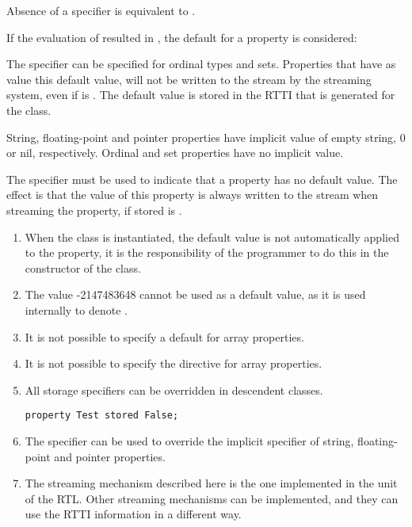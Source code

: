 \begin{remark}
Absence of a  specifier is equivalent to .
\end{remark}

If the evaluation of  resulted in , the default for a
property is considered:

The  specifier can be specified for ordinal types and sets.
Properties that have as value this default value, will not be written to
the stream by the streaming system, even if  is .
The default value is stored in the RTTI that is generated for the class.

String, floating-point and pointer properties have implicit 
value of empty string, 0 or nil, respectively.
Ordinal and set properties have no implicit  value.

The  specifier must be used to indicate
that a property has no default value. The effect is that the value of this
property is always written to the stream when streaming the property, if
stored is .

\begin{remark}
\begin{enumerate}
\item When the class is instantiated, the default value is not automatically
applied to the property, it is the responsibility of the programmer to do
this in the constructor of the class.
\item The value -2147483648 cannot be used as a default value, as it is used
internally to denote .
\item It is not possible to specify a default for array properties.
\item It is not possible to specify the  directive for array properties.
\item All storage specifiers can be overridden in descendent classes.
\begin{verbatim}
property Test stored False;
\end{verbatim}
\item The  specifier can be used to override the implicit
 specifier of string, floating-point and pointer properties.
\item The streaming mechanism described here is the one implemented in the
 unit of the RTL. Other streaming mechanisms can be
implemented, and they can use the RTTI information in a different way.
\end{enumerate}
\end{remark}

